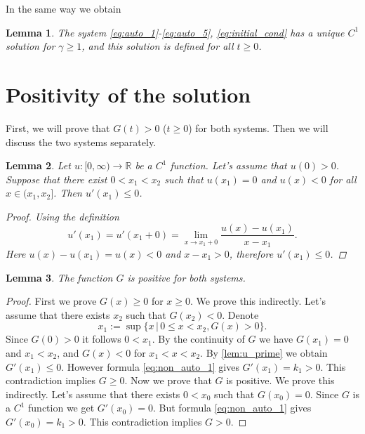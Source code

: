 \documentclass[pdflatex,sn-mathphys-num]{sn-jnl}
\theoremstyle{thmstyleone}
\newtheorem{lemma}{Lemma}[section]
\theoremstyle{thmstyletwo}
\theoremstyle{thmstylethree}
\begin{document}
In the same way we obtain 
\begin{lemma}
    The system \eqref{eq:auto_1}-\eqref{eq:auto_5}, \eqref{eq:initial_cond} 
    has a unique $C^1$ solution for $\gamma\geq 1$, and this solution is defined for all $t\geq 0$.
\end{lemma}

\section{Positivity of the solution}\label{sec:Positivity}

First, we will prove that $G(t) > 0$ ($t\geq 0$)  for both systems. 
Then we will discuss the two systems separately. 
\begin{lemma}\label{lem:u_prime}
Let $u:[0,\infty)\to\mathbb{R}$ be a $C^1$ function. Let's assume that $u(0) > 0$. 
Suppose that there exist $0<x_1<x_2$ such that $u(x_1)=0$ and $u(x)<0$ for all $x\in(x_1,x_2]$. 
Then $u'(x_1)\leq 0$.
\begin{proof}
 
Using the definition 
\begin{equation*}
    u'(x_1)=u'(x_1+0) = \lim_{x \to x_1+0} \frac{u(x) - u(x_1)}{x - x_1}.
\end{equation*}
Here $u(x) - u(x_1)=u(x)<0$ and $x-x_1>0$, therefore $u'(x_1)\leq 0$.  
\end{proof}
\end{lemma}
\begin{lemma}\label{lem:G pos}
    The function $G$ is positive for both systems.
\end{lemma}
\begin{proof}
First we prove $G(x)\geq 0$ for $x\geq 0$. 
We prove this indirectly. Let's assume that there exists $x_2$ such that $G(x_2)<0$. Denote
\begin{equation*}
    x_1:=\sup \{x\,|\,0\leq x<x_2, G(x)>0\}.
\end{equation*}
Since $G(0)>0$ it follows $0<x_1$. By the continuity of $G$ we have $G(x_1)=0$ and $x_1<x_2$, and 
$G(x)<0$ for $x_1<x<x_2$. By \autoref{lem:u_prime} we obtain $G'(x_1)\leq 0$. 
However formula \eqref{eq:non_auto_1} gives $G'(x_1)=k_1>0$. This contradiction 
implies $G\geq 0$. Now we prove that $G$ is positive. We prove this indirectly. 
Let's assume that there exists $0<x_0$ such that $G(x_0)=0$. Since $G$ is a $C^1$ function 
we get $G'(x_0)=0$. But formula \eqref{eq:non_auto_1} gives $G'(x_0)=k_1>0$. 
This contradiction implies $G> 0$. 
\end{proof}
\end{document}
